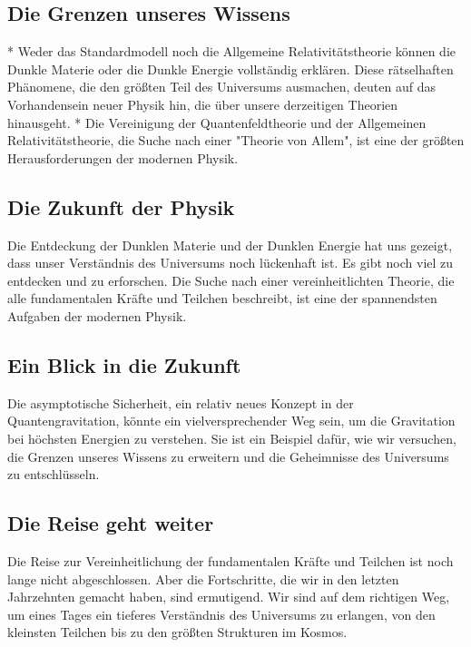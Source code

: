 \documentclass{article}
\begin{document}
\subsection{Die Grenzen unseres Wissens}

*   Weder das Standardmodell noch die Allgemeine Relativitätstheorie können die Dunkle Materie oder die Dunkle Energie vollständig erklären. Diese rätselhaften Phänomene, die den größten Teil des Universums ausmachen, deuten auf das Vorhandensein neuer Physik hin, die über unsere derzeitigen Theorien hinausgeht.
*   Die Vereinigung der Quantenfeldtheorie und der Allgemeinen Relativitätstheorie, die Suche nach einer "Theorie von Allem", ist eine der größten Herausforderungen der modernen Physik.

\subsection{Die Zukunft der Physik}

Die Entdeckung der Dunklen Materie und der Dunklen Energie hat uns gezeigt, dass unser Verständnis des Universums noch lückenhaft ist. Es gibt noch viel zu entdecken und zu erforschen. Die Suche nach einer vereinheitlichten Theorie, die alle fundamentalen Kräfte und Teilchen beschreibt, ist eine der spannendsten Aufgaben der modernen Physik.

\subsection{Ein Blick in die Zukunft}

Die asymptotische Sicherheit, ein relativ neues Konzept in der Quantengravitation, könnte ein vielversprechender Weg sein, um die Gravitation bei höchsten Energien zu verstehen. Sie ist ein Beispiel dafür, wie wir versuchen, die Grenzen unseres Wissens zu erweitern und die Geheimnisse des Universums zu entschlüsseln.

\subsection{Die Reise geht weiter}

Die Reise zur Vereinheitlichung der fundamentalen Kräfte und Teilchen ist noch lange nicht abgeschlossen. Aber die Fortschritte, die wir in den letzten Jahrzehnten gemacht haben, sind ermutigend. Wir sind auf dem richtigen Weg, um eines Tages ein tieferes Verständnis des Universums zu erlangen, von den kleinsten Teilchen bis zu den größten Strukturen im Kosmos.

	\tableofcontents	
\end{document}
